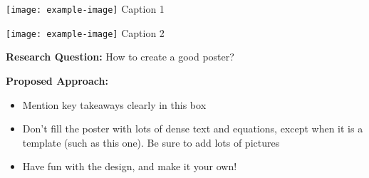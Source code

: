 \documentclass[paperwidth=76in, paperheight=46in, landscape, margin=5cm, fontscale = 0.215]{baposter}
\begin{document}
\begin{poster}
{\begin{tcolorbox}
{\begin{minipage}{\textwidth}
  \vspace{0.5cm}
  \centering
  \begin{minipage}{0.4\textwidth}
    \centering
    \texttt{[image: example-image]}
    {\footnotesize{Caption 1}}
    \label{fig:figure1}
  \end{minipage}%
  \hspace{0.1cm}
  \begin{minipage}{0.4\textwidth}
    \centering 
    \texttt{[image: example-image]} 
    {\footnotesize{Caption 2}} 
    \label{fig:figure2} 
  \end{minipage}
  \end{minipage}}

\vspace{1cm}
\textbf{Research Question:} How to create a good poster? 

\vspace{1cm}
\textbf{Proposed Approach:}
\begin{itemize}
  \item Mention key takeaways clearly in this box
  \item Don't fill the poster with lots of dense text and equations, except when it is a template (such as this one). Be sure to add lots of pictures
  \item Have fun with the design, and make it your own!
\end{itemize} 

\end{tcolorbox}
}



	


\end{poster}
\end{document}
